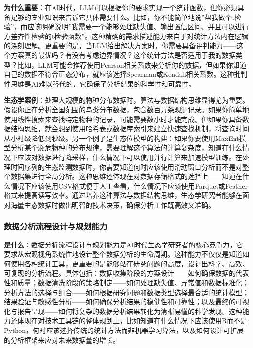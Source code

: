 \documentclass[
]{book}
\begin{document}
\textbf{为什么重要}：在AI时代，LLM可以根据你的要求实现一个统计函数，但你必须具备足够的专业知识来告诉它具体需要什么。比如，你不能简单地说''帮我做个t检验''，而应该明确说明''我需要一个能够处理缺失值、输出置信区间、并且可以进行方差齐性检验的t检验函数''。这种精确的需求描述能力来自于对统计方法内在逻辑的深刻理解。更重要的是，当LLM给出解决方案时，你需要具备评判能力------这个方案真的最优吗？有没有考虑边界情况？这个统计方法是否适用于我的数据类型？比如，LLM可能会推荐使用Pearson相关系数来分析你的数据，但如果你知道自己的数据不符合正态分布，就应该选择Spearman或Kendall相关系数。这种批判性思维是AI难以替代的，它确保了分析结果的科学性和可靠性。

\textbf{生态学案例}：处理大规模的物种分布数据时，算法与数据结构思维显得尤为重要。假设你正在分析全国范围的鸟类分布数据，包含数百万条观测记录。如果你简单地使用线性搜索来查找特定物种的记录，可能需要数小时才能完成。但如果你具备数据结构思维，就会想到使用哈希表或数据库索引来建立快速查找机制，将查询时间从小时级降低到秒级。另一个例子是生态位模型的构建：如果你要使用MaxEnt模型分析某个濒危物种的分布规律，需要理解这个算法的计算复杂度，知道在什么情况下应该对数据进行降采样，什么情况下可以使用并行计算来加速模型训练。在处理时间序列的生态监测数据时，你需要知道何时应该使用滑动窗口分析而不是对整个数据集进行全局分析。这种思维还体现在对数据存储格式的选择上------知道在什么情况下应该使用CSV格式便于人工查看，什么情况下应该使用Parquet或Feather格式来提高读写效率。通过培养这种算法与数据结构思维，生态学研究者能够在面对海量生态数据时做出明智的技术决策，确保分析工作既高效又准确。

\hypertarget{ux6570ux636eux5206ux6790ux6d41ux7a0bux8bbeux8ba1ux4e0eux89c4ux5212ux80fdux529b}{%
\subsubsection{数据分析流程设计与规划能力}\label{ux6570ux636eux5206ux6790ux6d41ux7a0bux8bbeux8ba1ux4e0eux89c4ux5212ux80fdux529b}}

\textbf{是什么}：数据分析流程设计与规划能力是AI时代生态学研究者的核心竞争力，它要求从宏观视角系统性地设计整个数据分析的生命周期。这种能力不仅仅是知道如何使用各种统计工具，更重要的是能够站在研究问题的高度，设计出科学、高效、可复现的分析流程。具体包括：数据收集阶段的方案设计------如何确保数据的代表性和质量；数据清洗阶段的策略制定------如何处理缺失值、异常值和数据标准化；分析方法的选择与组合------如何根据研究问题和数据类型选择最合适的统计模型；结果验证与敏感性分析------如何确保分析结果的稳健性和可靠性；以及最终的可视化与报告呈现------如何将复杂的数据分析结果转化为清晰易懂的科学发现。这种能力还体现在对技术工具链的整体规划上，比如知道在什么情况下应该使用R而不是Python，何时应该选择传统的统计方法而非机器学习算法，以及如何设计可扩展的分析框架来应对未来数据量的增长。
\end{document}
